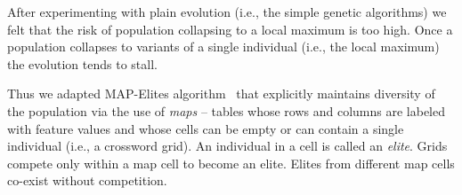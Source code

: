 After experimenting with plain evolution (i.e., the simple genetic algorithms) we felt that the risk of population collapsing to a local maximum is too high. Once a population collapses to variants of a single individual (i.e., the local maximum) the evolution tends to stall. 


Thus we adapted MAP-Elites algorithm~\cite{mapElites} that explicitly maintains diversity of the population via the use of {\em maps} -- tables whose rows and columns are labeled with feature values and whose cells can be empty or can contain a single individual (i.e., a crossword grid). An individual in a cell is called an {\em elite}. Grids compete only within a map cell to become an elite. Elites from different map cells co-exist without competition.

